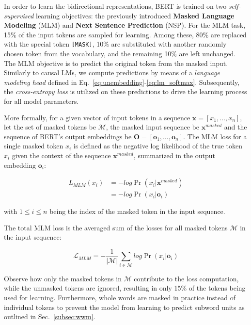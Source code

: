 In order to learn the bidirectional representations, BERT is trained on two
\textit{self-supervised} learning objectives: the previously introduced
\textbf{Masked Language Modeling} (MLM) and \textbf{Next Sentence Prediction}
(NSP). For the MLM task, 15\% of the input tokens are sampled for learning.
Among these, 80\% are replaced with the special token \texttt{[MASK]}, 10\% are
substituted with another randomly chosen token from the vocabulary, and the
remaining 10\% are left unchanged. The MLM objective is to predict the original
token from the masked input. Similarly to causal LMs, we compute predictions by
means of a \textit{language modeling head} defined in
Eq.~\ref{eq:unembedding}-\ref{eq:lm_softmax}. Subsequently, the
\textit{cross-entropy loss} is utilized on these predictions to drive the
learning process for all model parameters. 

More formally, for a given vector of input tokens in a sequence $\bm{x} =
[x_{1}, \ldots, x_{n}]$, let the set of masked tokens be $\mathcal{M}$, the
masked input sequence be $\bm{x}^{masked}$ and the sequence of BERT's output
embeddings be $\bm{O} = [\bm{o}_{1}, \ldots, \bm{o}_{n}]$. The MLM loss for a
single masked token $x_{i}$ is defined as the negative log likelihood of the
true token $x_{i}$ given the context of the sequence $\bm{x}^{masked}$,
summarized in the output embedding $\bm{o}_{i}$:

\begin{align}
    L_{MLM}(x_i) &= -log \Pr(x_i | \bm{x}^{masked}) \\
                 &= -log \Pr(x_i | \bm{o}_{i})
\end{align}

with $1 \leq i \leq n$ being the index of the masked token in the input
sequence.

The total MLM loss is the averaged sum of the losses for all masked tokens
$\mathcal{M}$ in the input sequence:

\begin{equation}
    \mathcal{L}_{MLM} = -\frac{1}{|\mathcal{M}|} \sum_{i \in \mathcal{M}} log \Pr(x_i | \bm{o}_{i})
\end{equation}

Observe how only the masked tokens in $\mathcal{M}$ contribute to the loss
computation, while the unmasked tokens are ignored, resulting in only 15\% of
the tokens being used for learning. Furthermore, whole words are masked in
practice instead of individual tokens to prevent the model from learning to
predict subword units as outlined in Sec.~\ref{subsec:wwm}.

